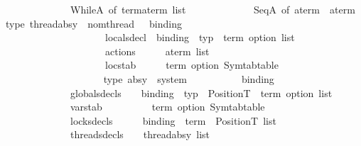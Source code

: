 \begin{isabellebody}
\ \ \ \ \ \ \ \ \ \ \ \ {\isacharbar}{\kern0pt}\ WhileA\ of\ term{\isacharasterisk}{\kern0pt}{\isacharparenleft}{\kern0pt}a{\isacharunderscore}{\kern0pt}term\ list{\isacharparenright}{\kern0pt}\isanewline
\ \ \ \ \ \ \ \ \ \ \ \ {\isacharbar}{\kern0pt}\ SeqA\ of\ a{\isacharunderscore}{\kern0pt}term\ {\isacharasterisk}{\kern0pt}\ a{\isacharunderscore}{\kern0pt}term\isanewline
\isanewline
type\ thread{\isacharunderscore}{\kern0pt}absy\ {\isacharequal}{\kern0pt}\ {\isacharbraceleft}{\kern0pt}nom{\isacharunderscore}{\kern0pt}thread\ \ {\isacharcolon}{\kern0pt}\ binding\ {\isacharcomma}{\kern0pt}\isanewline
\ \ \ \ \ \ \ \ \ \ \ \ \ \ \ \ \ \ \ \ locals{\isacharunderscore}{\kern0pt}decl\ {\isacharcolon}{\kern0pt}\ {\isacharparenleft}{\kern0pt}{\isacharparenleft}{\kern0pt}binding\ {\isacharasterisk}{\kern0pt}\ typ{\isacharparenright}{\kern0pt}\ {\isacharasterisk}{\kern0pt}\ term\ option{\isacharparenright}{\kern0pt}\ list\ {\isacharcomma}{\kern0pt}\isanewline
\ \ \ \ \ \ \ \ \ \ \ \ \ \ \ \ \ \ \ \ actions\ \ \ \ \ {\isacharcolon}{\kern0pt}\ a{\isacharunderscore}{\kern0pt}term\ list{\isacharcomma}{\kern0pt}\isanewline
\ \ \ \ \ \ \ \ \ \ \ \ \ \ \ \ \ \ \ \ locstab\ \ \ \ \ {\isacharcolon}{\kern0pt}\ {\isacharparenleft}{\kern0pt}term\ option{\isacharparenright}{\kern0pt}\ Symtab{\isachardot}{\kern0pt}table\isanewline
\ \ \ \ \ \ \ \ \ \ \ \ \ \ \ \ \ \ \ {\isacharbraceright}{\kern0pt}\isanewline
type\ absy\ {\isacharequal}{\kern0pt}\ {\isacharbraceleft}{\kern0pt}system\ \ \ \ \ \ \ \ \ \ {\isacharcolon}{\kern0pt}\ binding{\isacharcomma}{\kern0pt}\isanewline
\ \ \ \ \ \ \ \ \ \ \ \ \ globals{\isacharunderscore}{\kern0pt}decls\ \ \ {\isacharcolon}{\kern0pt}\ {\isacharparenleft}{\kern0pt}binding\ {\isacharasterisk}{\kern0pt}\ typ\ {\isacharasterisk}{\kern0pt}\ Position{\isachardot}{\kern0pt}T\ {\isacharasterisk}{\kern0pt}\ term\ option{\isacharparenright}{\kern0pt}\ list{\isacharcomma}{\kern0pt}\isanewline
\ \ \ \ \ \ \ \ \ \ \ \ \ varstab\ \ \ \ \ \ \ \ \ {\isacharcolon}{\kern0pt}\ {\isacharparenleft}{\kern0pt}term\ option{\isacharparenright}{\kern0pt}\ Symtab{\isachardot}{\kern0pt}table{\isacharcomma}{\kern0pt}\isanewline
\ \ \ \ \ \ \ \ \ \ \ \ \ locks{\isacharunderscore}{\kern0pt}decls\ \ \ \ \ {\isacharcolon}{\kern0pt}\ {\isacharparenleft}{\kern0pt}binding\ {\isacharasterisk}{\kern0pt}\ term\ {\isacharasterisk}{\kern0pt}\ Position{\isachardot}{\kern0pt}T{\isacharparenright}{\kern0pt}\ list{\isacharcomma}{\kern0pt}\isanewline
\ \ \ \ \ \ \ \ \ \ \ \ \ threads{\isacharunderscore}{\kern0pt}decls\ \ \ {\isacharcolon}{\kern0pt}\ thread{\isacharunderscore}{\kern0pt}absy\ list\isanewline

\end{isabellebody}
